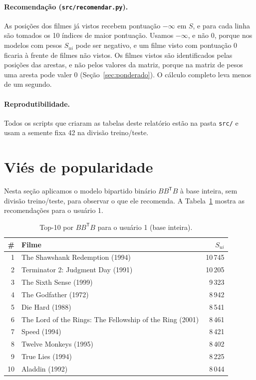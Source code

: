 \documentclass[12pt,a4paper]{article}
\theoremstyle{definition}
\begin{document}
\paragraph{Recomendação (\texttt{src/recomendar.py}).}
As posições dos filmes já vistos recebem pontuação $-\infty$ em $S$, e para
cada linha são tomados os 10 índices de maior pontuação. Usamos $-\infty$, e
não 0, porque nos modelos com pesos $S_{ui}$ pode ser negativo, e um filme
visto com pontuação 0 ficaria à frente de filmes não vistos. Os filmes
vistos são identificados pelas posições das arestas, e não pelos valores
da matriz, porque na matriz de pesos uma aresta pode valer 0
(Seção~\ref{sec:ponderado}). O cálculo completo leva menos de um segundo.

\paragraph{Reprodutibilidade.}
Todos os scripts que criaram as tabelas deste relatório estão na
pasta \texttt{src/} e usam a semente fixa 42 na divisão treino/teste.

\section{Viés de popularidade}\label{sec:vies}

Nesta seção aplicamos o modelo bipartido binário $BB^{\mathsf T}B$ à base
inteira, sem divisão treino/teste, para observar o que ele recomenda. A
Tabela~\ref{tab:top10} mostra as recomendações para o usuário 1.

\begin{table}[ht]
\centering
\begin{tabular}{rlr}
\toprule
\# & Filme & $S_{ui}$ \\
\midrule
1  & The Shawshank Redemption (1994) & 10\,745 \\
2  & Terminator 2: Judgment Day (1991) & 10\,205 \\
3  & The Sixth Sense (1999) & 9\,323 \\
4  & The Godfather (1972) & 8\,942 \\
5  & Die Hard (1988) & 8\,541 \\
6  & The Lord of the Rings: The Fellowship of the Ring (2001) & 8\,461 \\
7  & Speed (1994) & 8\,421 \\
8  & Twelve Monkeys (1995) & 8\,402 \\
9  & True Lies (1994) & 8\,225 \\
10 & Aladdin (1992) & 8\,044 \\
\bottomrule
\end{tabular}
\caption{Top-10 por $BB^{\mathsf T}B$ para o usuário 1 (base inteira).}
\label{tab:top10}
\end{table}
\end{document}
